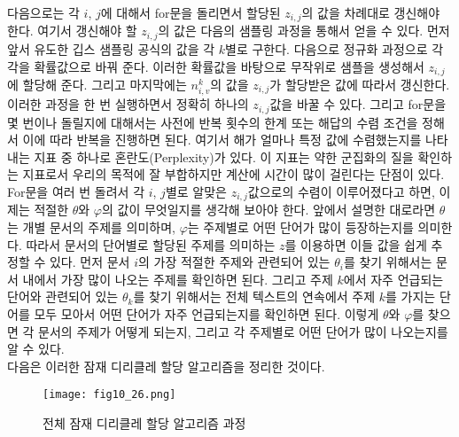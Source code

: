 \documentclass[a4paper]{oblivoir}
\begin{document}
다음으로는 각 $i$, $j$에 대해서 for문을 돌리면서 할당된 $z_{i,j}$의 값을 차례대로 갱신해야 한다. 여기서 갱신해야 할 $z_{i,j}$의 값은 다음의 샘플링 과정을 통해서 얻을 수 있다. 먼저 앞서 유도한 깁스 샘플링 공식의 값을 각 $k$별로 구한다. 다음으로 정규화 과정으로 각각을 확률값으로 바꿔 준다. 이러한 확률값을 바탕으로 무작위로 샘플을 생성해서 $z_{i,j}$에 할당해 준다. 그리고 마지막에는 $n^{k}_{i,v}$의 값을 $z_{i,j}$가 할당받은 값에 따라서 갱신한다. 이러한 과정을 한 번 실행하면서 정확히 하나의 $z_{i,j}$값을 바꿀 수 있다. 그리고 for문을 몇 번이나 돌릴지에 대해서는 사전에 반복 횟수의 한계 또는 해답의 수렴 조건을 정해서 이에 따라 반복을 진행하면 된다. 여기서 해가 얼마나 특정 값에 수렴했는지를 나타내는 지표 중 하나로 혼란도(Perplexity)가 있다. 이 지표는 약한 군집화의 질을 확인하는 지표로서 우리의 목적에 잘 부합하지만 계산에 시간이 많이 걸린다는 단점이 있다. \\      

For문을 여러 번 돌려서 각 $i$, $j$별로 알맞은 $z_{i,j}$값으로의 수렴이 이루어졌다고 하면, 이제는 적절한 $\theta$와 $\varphi$의 값이 무엇일지를 생각해 보아야 한다. 앞에서 설명한 대로라면 $\theta$는 개별 문서의 주제를 의미하며, $\varphi$는 주제별로 어떤 단어가 많이 등장하는지를 의미한다. 따라서 문서의 단어별로 할당된 주제를 의미하는 $z$를 이용하면 이들 값을 쉽게 추정할 수 있다. 먼저 문서 $i$의 가장 적절한 주제와 관련되어 있는 $\theta_i$를 찾기 위해서는 문서 내에서 가장 많이 나오는 주제를 확인하면 된다. 그리고 주제 $k$에서 자주 언급되는 단어와 관련되어 있는 $\theta_k$를 찾기 위해서는 전체 텍스트의 연속에서 주제 $k$를 가지는 단어를 모두 모아서 어떤 단어가 자주 언급되는지를 확인하면 된다. 이렇게 $\theta$와 $\varphi$를 찾으면 각 문서의 주제가 어떻게 되는지, 그리고 각 주제별로 어떤 단어가 많이 나오는지를 알 수 있다. \\

다음은 이러한 잠재 디리클레 할당 알고리즘을 정리한 것이다.
            
\begin{figure}[ht] \centering 
\texttt{[image: fig10\_26.png]} 
\caption{전체 잠재 디리클레 할당 알고리즘 과정}
\label{fig:10-24}
\end{figure}
      
\end{document}
